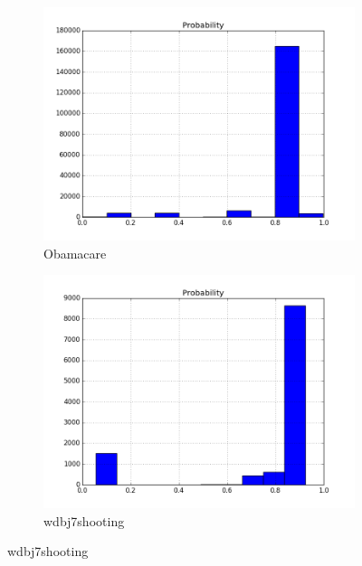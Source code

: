 \begin{figure}[t!]
	\medskip
	\begin{subfigure}{0.50\textwidth}
		\includegraphics[width=\linewidth]{figures/Obamacare.png}
		\caption{Obamacare} \label{fig:c}
	\end{subfigure}\hspace*{\fill}
	\begin{subfigure}{0.50\textwidth}
		\includegraphics[width=\linewidth]{figures/wdbj7shooting.png}
		\caption{wdbj7shooting} \label{fig:d}
	\end{subfigure}


\end{figure}
